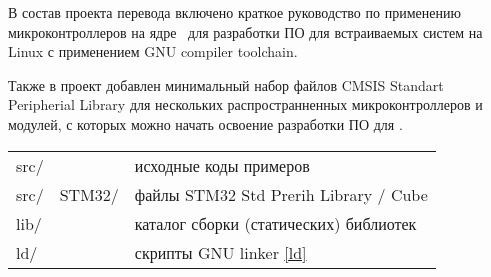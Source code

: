 \pagebreak
{}\secdown

В состав проекта перевода включено краткое руководство по применению
микроконтроллеров на ядре \cm{}\ для разработки ПО для встраиваемых систем
на Linux с применением GNU compiler toolchain.

\bigskip\noindent
Также в проект добавлен минимальный набор файлов CMSIS Standart Peripherial
Library для нескольких распространненных микроконтроллеров и модулей, с которых
можно начать освоение разработки ПО для \cm{}.

\bigskip
\begin{tabular}{l ll}
src/ && исходные коды примеров \\
src/ & STM32/ & файлы STM32 Std Prerih Library / Cube \\
lib/ && каталог сборки (статических) библиотек \\
ld/ && скрипты GNU linker \ref{ld} \\
\end{tabular}






\secup
